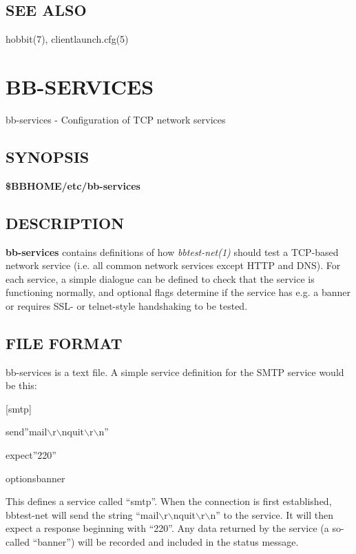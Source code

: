 \subsection{SEE ALSO}
hobbit(7), clientlaunch.cfg(5) 

 


  

%
\newpage
\section{BB-SERVICES}

 bb-services - Configuration of TCP network services 

 
\subsection{SYNOPSIS}
\textbf{\$BBHOME/etc/bb-services}


 
\subsection{DESCRIPTION}
\textbf{bb-services}
 contains definitions of how \emph{bbtest-net(1)}
 should test a TCP-based network service (i.e. all common network services except HTTP and DNS). For each service, a simple dialogue can be defined to check that the service is functioning normally, and optional flags determine if the service has e.g. a banner or requires SSL- or telnet-style handshaking to be tested. 

 
\subsection{FILE FORMAT}
 bb-services is a text file. A simple service definition for the SMTP service would be this:  


  
[smtp]  
 
send''mail$\backslash$r$\backslash$nquit$\backslash$r$\backslash$n''  
 
expect''220''  
 
optionsbanner  



  This defines a service called ``smtp''. When the connection is first established, bbtest-net will send the string ``mail$\backslash$r$\backslash$nquit$\backslash$r$\backslash$n'' to the service. It will then expect a response beginning with ``220''. Any data returned by the service (a so-called ``banner'') will be recorded and included in the status message. 


